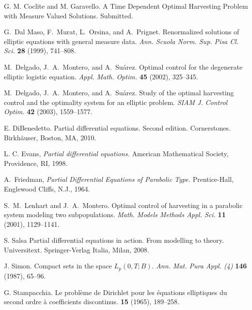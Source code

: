 \documentclass[11pt,leqno]{amsart}
\numberwithin{equation}{section}
\begin{document}
\begin{thebibliography}{10}
\newblock  G. M. Coclite and M. Garavello.  
\newblock  A Time Dependent Optimal Harvesting Problem with Measure Valued Solutions.
\newblock Submitted.

G.~Dal Maso, F.~Murat, L.~Orsina, and A.~Prignet.
Renormalized solutions of elliptic equations with general measure data.
{\it Ann. Scuola Norm. Sup. Pisa Cl. Sci.} {\bf   28} (1999),  741--808.

 M.~Delgado, J.~A.~Montero, and A.~Su\'arez.
Optimal control for the degenerate elliptic logistic equation.
{\it Appl. Math. Optim.} {\bf 45} (2002), 325--345.

 M.~Delgado, J.~A.~Montero, and A.~Su\'arez.
 Study of the optimal harvesting control and the  optimality system for an elliptic problem.
{\it  SIAM J. Control Optim.} {\bf 42} (2003), 1559--1577.

\newblock E. DiBenedetto.
\newblock Partial differential equations.
\newblock Second edition. Cornerstones. Birkh\"auser, Boston, MA, 2010.

 L. C. Evans,
{\it Partial differential equations.} 
American Mathematical Society, Providence, RI, 1998. 

 A.~Friedman,
{\it Partial Differential Equations of Parabolic Type.} 
Prentice-Hall, Englewood Cliffs, N.J., 1964. 

S.~M.~Lenhart and J.~A.~Montero.
Optimal control of harvesting in a parabolic system modeling two subpopulations.
{\it Math. Models Methods Appl. Sci.} {\bf 11} (2001), 1129--1141.

\newblock S. Salsa
\newblock Partial differential equations in action. 
From modelling to theory. 
\newblock Universitext. Springer-Verlag Italia, Milan, 2008. 

J. Simon. Compact sets in the space $L_p (0, T ; B)$. {\em Ann. Mat. Pura Appl. (4)} {\bf 146} (1987), 65--96. 

G. Stampacchia.
\newblock Le probl\`eme de Dirichlet pour les \'equations elliptiques du second ordre \`a coefficients discontinus.
 {\bf 15} (1965), 189--258.
\end{thebibliography}
\end{document}
